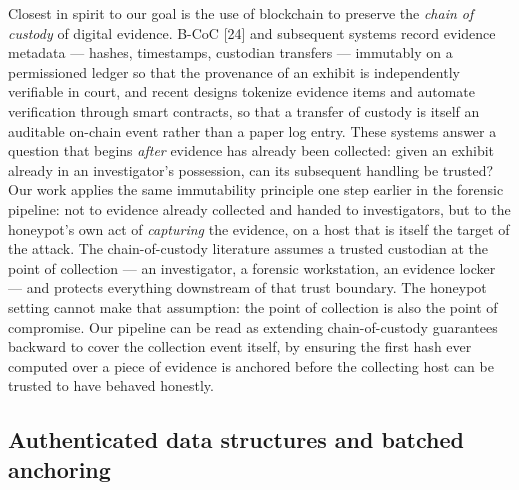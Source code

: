 \documentclass[journal]{IEEEtran}
\begin{document}
Closest in spirit to our goal is the use of blockchain to preserve the \emph{chain of custody} of digital evidence. B-CoC [24] and subsequent systems record evidence metadata --- hashes, timestamps, custodian transfers --- immutably on a permissioned ledger so that the provenance of an exhibit is independently verifiable in court, and recent designs tokenize evidence items and automate verification through smart contracts, so that a transfer of custody is itself an auditable on-chain event rather than a paper log entry. These systems answer a question that begins \emph{after} evidence has already been collected: given an exhibit already in an investigator's possession, can its subsequent handling be trusted? Our work applies the same immutability principle one step earlier in the forensic pipeline: not to evidence already collected and handed to investigators, but to the honeypot's own act of \emph{capturing} the evidence, on a host that is itself the target of the attack. The chain-of-custody literature assumes a trusted custodian at the point of collection --- an investigator, a forensic workstation, an evidence locker --- and protects everything downstream of that trust boundary. The honeypot setting cannot make that assumption: the point of collection is also the point of compromise. Our pipeline can be read as extending chain-of-custody guarantees backward to cover the collection event itself, by ensuring the first hash ever computed over a piece of evidence is anchored before the collecting host can be trusted to have behaved honestly.

\subsection{Authenticated data structures and batched anchoring}
\end{document}
